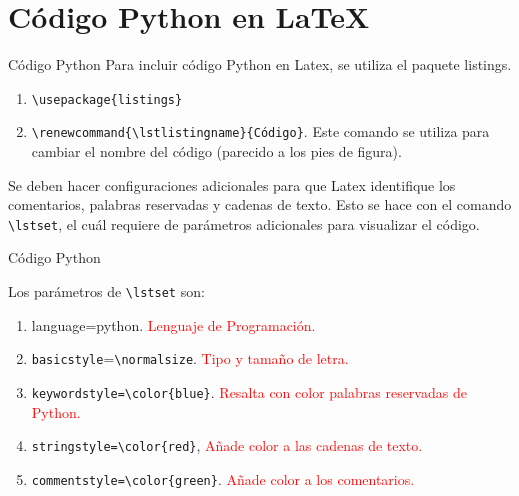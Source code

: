 \documentclass[aspectratio=169, 10pt]{beamer}
\renewcommand{\lstlistingname}{Código}
\begin{document}







\section{Código Python en \LaTeX}
\begin{frame}[fragile]{Código Python}
Para incluir código Python en Latex, se utiliza el paquete listings.

    \begin{enumerate}
        \item \verb|\usepackage{listings}| 
        \item \verb|\renewcommand{\lstlistingname}{Código}|. Este comando se utiliza para cambiar el nombre del código (parecido a los pies de figura).
    \end{enumerate}

Se deben hacer configuraciones adicionales para que Latex identifique los comentarios, palabras reservadas y cadenas de texto. Esto se hace con el comando \verb|\lstset|, el cuál requiere de parámetros adicionales para visualizar el código.
\end{frame}


\begin{frame}[fragile]{Código Python}

Los parámetros de \verb|\lstset| son:

    \begin{enumerate} \pause
        \item language=python. \textcolor{red}{Lenguaje de Programación.} \pause
        \item \verb|basicstyle|=\verb|\normalsize|. \textcolor{red}{Tipo y tamaño de letra.} \pause
        \item \verb|keywordstyle=\color{blue}|. \textcolor{red}{Resalta con color palabras reservadas de Python.} \pause
        \item \verb|stringstyle=\color{red}|, \textcolor{red}{Añade color a las cadenas de texto.} \pause
        \item \verb|commentstyle=\color{green}|. \textcolor{red}{Añade color a los comentarios.} \pause
    \end{enumerate}


\end{frame}
\end{document}
